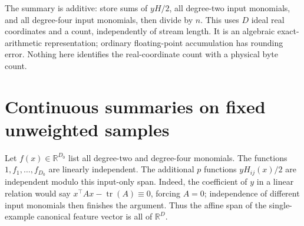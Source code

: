 \documentclass[11pt]{article}
\newcommand{\R}{\mathbb R}
\newcommand{\tr}{\operatorname{tr}}
\begin{document}
The summary is additive: store sums of $yH/2$, all degree-two input
monomials, and all degree-four input monomials, then divide by $n$.
This uses $D$ ideal real coordinates and a count, independently of stream
length. It is an algebraic exact-arithmetic representation; ordinary
floating-point accumulation has rounding error. Nothing here identifies
the real-coordinate count with a physical byte count.

\section{Continuous summaries on fixed unweighted samples}

Let $f(x)\in\R^{D_0}$ list all degree-two and degree-four monomials.
The functions $1,f_1,\ldots,f_{D_0}$ are linearly independent. The
additional $p$ functions $yH_{ij}(x)/2$ are independent modulo this
input-only span. Indeed, the coefficient of $y$ in a linear relation
would say $x^\top Ax-\tr(A)\equiv0$, forcing $A=0$; independence of
different input monomials then finishes the argument. Thus the affine
span of the single-example canonical feature vector is all of $\R^D$.
\end{document}
